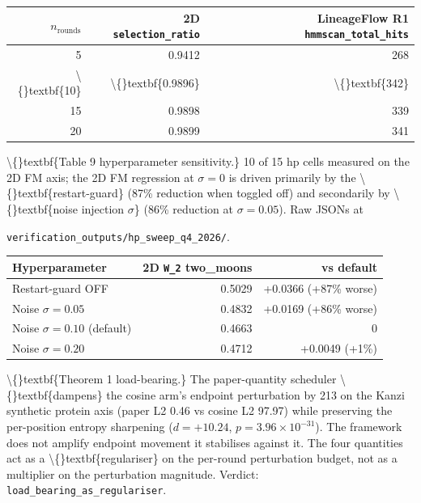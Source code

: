 \documentclass[preprint,3p,times,twocolumn]{elsarticle}
\begin{document}
\begin{table}[ht]
\centering
\small
\begin{tabular}{rrr}
\hline
\textbf{$n_\mathrm{rounds}$} & \textbf{2D \texttt{selection\_ratio}} & \textbf{LineageFlow R1 \texttt{hmmscan\_total\_hits}} \\
\hline
5 & 0.9412 & 268 \\
\textbackslash\{\}textbf\{10\} & \textbackslash\{\}textbf\{0.9896\} & \textbackslash\{\}textbf\{342\} \\
15 & 0.9898 & 339 \\
20 & 0.9899 & 341 \\
\hline
\end{tabular}
\end{table}

\textbackslash\{\}textbf\{Table 9  hyperparameter sensitivity.\} 10 of 15 hp cells measured on the 2D FM axis; the 2D FM regression at $\sigma = 0$ is driven primarily by the \textbackslash\{\}textbf\{restart-guard\} (87\% reduction when toggled off) and secondarily by \textbackslash\{\}textbf\{noise injection $\sigma$\} (86\% reduction at $\sigma = 0.05$). Raw JSONs at

\texttt{verification\_outputs/hp\_sweep\_q4\_2026/}.

\begin{table}[ht]
\centering
\small
\begin{tabular}{lrr}
\hline
\textbf{Hyperparameter} & \textbf{2D \texttt{W\_2} two\_moons} & \textbf{ vs default} \\
\hline
Restart-guard OFF & 0.5029 & +0.0366 (+87\% worse) \\
Noise $\sigma = 0.05$ & 0.4832 & +0.0169 (+86\% worse) \\
Noise $\sigma = 0.10$ (default) & 0.4663 & 0 \\
Noise $\sigma = 0.20$ & 0.4712 & +0.0049 (+1\%) \\
\hline
\end{tabular}
\end{table}

\textbackslash\{\}textbf\{Theorem 1 load-bearing.\} The paper-quantity scheduler \textbackslash\{\}textbf\{dampens\} the cosine arm's endpoint perturbation by  213 on the Kanzi synthetic protein axis (paper L2  0.46 vs cosine L2  97.97) while preserving the per-position entropy sharpening ($d = +10.24$, $p = 3.96 \times 10^{-31}$). The framework does not amplify endpoint movement  it stabilises against it. The four quantities act as a \textbackslash\{\}textbf\{regulariser\} on the per-round perturbation budget, not as a multiplier on the perturbation magnitude. Verdict: \texttt{load\_bearing\_as\_regulariser}.
\end{document}

